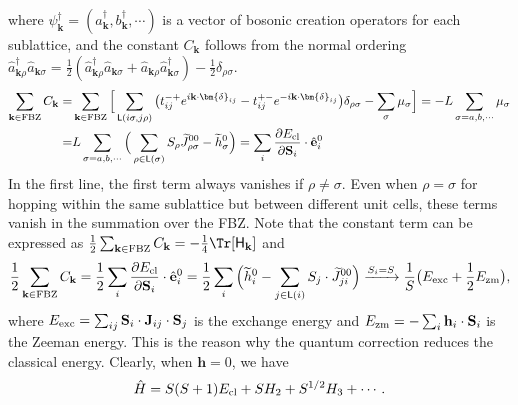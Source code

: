 where $\psi^{\dagger}_{\mathbf{k}} = (a^{\dagger}_{\mathbf{k}}, b^{\dagger}_{\mathbf{k}}, \cdots)$ is a vector of bosonic creation operators for each sublattice, and the constant $C_{\mathbf{k}}$ follows from the normal ordering $\hat{a}_{\mathbf{k}\rho}^{\dagger} \hat{a}_{\mathbf{k}\sigma} = \frac{1}{2} (\hat{a}_{\mathbf{k}\rho}^{\dagger} \hat{a}_{ \mathbf{k}\sigma} + \hat{a}_{ \mathbf{k}\rho} \hat{a}_{\mathbf{k}\sigma}^{\dagger} ) - \frac{1}{2} \delta_{\rho\sigma}$.
\begin{align}
    \sum_{\mathbf{k} \in \mathrm{FBZ}} C_{\mathbf{k}} 
    = & \sum_{\mathbf{k} \in \mathrm{FBZ}} \Big[
    \sum_{\mathsf{L}(i\sigma,j\rho)} \big( t^{-+}_{ij} e^{i \mathbf{k} \cdot \bm{\delta}_{ij}} - t^{+-}_{ij} e^{-i \mathbf{k} \cdot \bm{\delta}_{ij}}\big) \delta_{\rho\sigma}    - \sum_{\sigma} \mu_{\sigma} \Big]
    = - L \sum_{\sigma = a, b, \cdots} \mu_{\sigma} \nonumber \\
    = & L \sum_{\sigma = a, b, \cdots} \Big( \sum_{\rho \in \mathsf{L}(\sigma)} S_{\rho} \widetilde{J}_{\rho\sigma}^{00} - \widetilde{h}_{\sigma}^{0} \Big) 
    = \sum_{i} \frac{\partial E_{\rm cl}}{\partial \mathbf{S}_{i}} \cdot \hat{\mathbf{e}}_{i}^{0} 
\end{align}
In the first line, the first term always vanishes if $\rho \neq \sigma$.
Even when $\rho = \sigma$ for hopping within the same sublattice but between different unit cells, these terms vanish in the summation over the FBZ.
Note that the constant term can be expressed as $\frac{1}{2} \sum_{\mathbf{k} \in \mathrm{FBZ}}  C_{\mathbf{k}}  = - \frac{1}{4} \Tr[\mathsf{H}_{\mathbf{k}}]$ and 
\begin{equation}
    \frac{1}{2} \sum_{\mathbf{k} \in \mathrm{FBZ}}  C_{\mathbf{k}} 
    = \frac{1}{2} \sum_{i} \frac{\partial E_{\rm cl}}{\partial \mathbf{S}_{i}} \cdot \hat{\mathbf{e}}_{i}^{0} 
    = \frac{1}{2} \sum_{i} \Big( \widetilde{h}_{i}^{0} - \sum_{j \in \mathsf{L}(i)} S_{j} \cdot \widetilde{J}_{ji}^{00} \Big)
    \xrightarrow{ S_{i} = S}  
    \frac{1}{S} \big( E_{\rm exc} + \frac{1}{2}  E_{\rm zm} \big),
\end{equation}
where $ E_{\rm exc} = \sum_{ij} \mathbf{S}_i \cdot \mathbf{J}_{ij} \cdot \mathbf{S}_j $ is the exchange energy and $ E_{\rm zm} = - \sum_{i} \mathbf{h}_{i} \cdot \mathbf{S}_{i}$ is the Zeeman energy. 
This is the reason why the quantum correction reduces the classical energy. 
Clearly, when $\mathbf{h} = 0$, we have
\begin{equation}
    \hat{H} = S(S+1) E_{\rm cl} + S H_{2} + S^{1/2} H_{3} + \cdots .
\end{equation}

